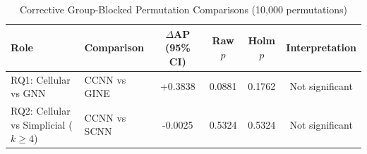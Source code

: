 \begin{table}[htbp]
\centering
\caption{Corrective Group-Blocked Permutation Comparisons (10,000 permutations)}
\label{tab:hypothesis_tests}
\begin{tabular}{llcccc}
\hline
\textbf{Role} & \textbf{Comparison} & \textbf{$\Delta$AP (95\% CI)} & \textbf{Raw $p$} & \textbf{Holm $p$} & \textbf{Interpretation} \\
\hline
RQ1: Cellular vs GNN & CCNN vs GINE & +0.3838 & 0.0881 & 0.1762 & Not significant \\
RQ2: Cellular vs Simplicial ($k \ge 4$) & CCNN vs SCNN & -0.0025 & 0.5324 & 0.5324 & Not significant \\
\hline
\end{tabular}
\end{table}
